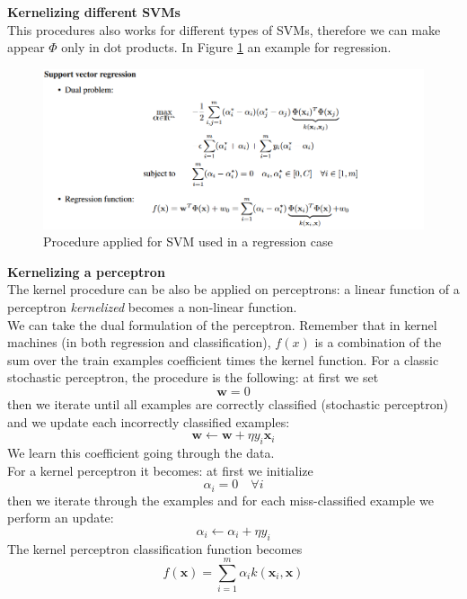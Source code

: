 \textbf{Kernelizing different SVMs}\\
This procedures also works for different types of SVMs, therefore we can make appear $\Phi$ only in dot products. In Figure \ref{fig:SVM_regression_kernel} an example for regression.\\
\begin{figure}[ht]
    \centering
    \includegraphics[scale=0.5]{images/kernel_SVM_regression.png}
    \caption{Procedure applied for SVM used in a regression case}
    \label{fig:SVM_regression_kernel}
\end{figure}

\textbf{Kernelizing a perceptron}\\
The kernel procedure can be also be applied on perceptrons: a linear function of a perceptron \textit{kernelized} becomes a non-linear function.\\
We can take the dual formulation of the perceptron. Remember that in kernel machines (in both regression and classification), $f(x)$ is a combination of the sum over the train examples coefficient times the kernel function.
For a classic stochastic perceptron, the procedure is the following: at first we set 
$$\pmb{w} = 0$$
then we iterate until all examples are correctly classified (stochastic perceptron) and we update each incorrectly classified examples: 
$$\pmb{w} \leftarrow \pmb{w} + \eta y_i \pmb{x}_i$$
We learn this coefficient going through the data. \\

For a kernel perceptron it becomes: 
at first we initialize
$$\alpha_i = 0 \quad \forall i$$
then we iterate through the examples and for each miss-classified example we perform an update:
$$\alpha_i \leftarrow \alpha_i + \eta y_i$$
The kernel perceptron classification function becomes
$$f(\pmb{x}) = \sum _{i=1} ^m \alpha_i k(\pmb{x}_i, \pmb{x})$$


